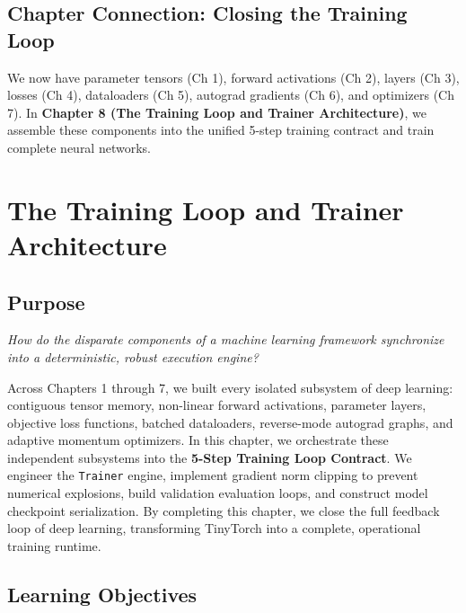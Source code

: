 \documentclass[
  letterpaper,
]{scrbook}
\begin{document}
\section{Chapter Connection: Closing the Training
Loop}\label{chapter-connection-closing-the-training-loop-1}

We now have parameter tensors (Ch 1), forward activations (Ch 2), layers
(Ch 3), losses (Ch 4), dataloaders (Ch 5), autograd gradients (Ch 6),
and optimizers (Ch 7). In \textbf{Chapter 8 (The Training Loop and
Trainer Architecture)}, we assemble these components into the unified
5-step training contract and train complete neural networks.

\chapter{The Training Loop and Trainer
Architecture}\label{the-training-loop-and-trainer-architecture}

\section*{Purpose}\label{purpose-8}


\emph{How do the disparate components of a machine learning framework
synchronize into a deterministic, robust execution engine?}

Across Chapters 1 through 7, we built every isolated subsystem of deep
learning: contiguous tensor memory, non-linear forward activations,
parameter layers, objective loss functions, batched dataloaders,
reverse-mode autograd graphs, and adaptive momentum optimizers. In this
chapter, we orchestrate these independent subsystems into the
\textbf{5-Step Training Loop Contract}. We engineer the \texttt{Trainer}
engine, implement gradient norm clipping to prevent numerical
explosions, build validation evaluation loops, and construct model
checkpoint serialization. By completing this chapter, we close the full
feedback loop of deep learning, transforming TinyTorch into a complete,
operational training runtime.

\section{Learning Objectives}\label{learning-objectives-8}
\end{document}
